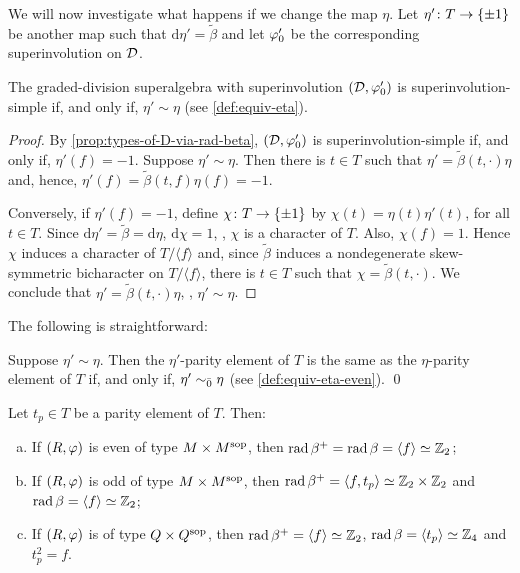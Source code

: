 We will now investigate what happens if we change the map $\eta$. 
Let $\eta'\colon T \to \{ \pm 1 \}$ be another map such that $\mathrm{d}\eta' = \tilde \beta$ and let $\varphi_0'$ be the corresponding superinvolution on $\mathcal{D}$.  

\begin{lemma}\label{lemma:one-eta}
    The graded-division superalgebra with superinvolution $(\mathcal{D}, \varphi_0')$ is super\-in\-vo\-lu\-tion-sim\-ple if, and only if, $\eta' \sim \eta$ (see \cref{def:equiv-eta}). 
\end{lemma}

\begin{proof}
    By \cref{prop:types-of-D-via-rad-beta}, $(\mathcal{D}, \varphi_0')$ is superinvolution-simple if, and only if, $\eta'(f) = -1$.  
    Suppose $\eta' \sim \eta$. 
    Then there is $t\in T$ such that $\eta' = \tilde\beta(t, \cdot) \eta$ and, hence, $\eta'(f) = \tilde\beta(t, f) \eta(f) = -1$. 
    
    Conversely, if $\eta' (f) = -1$, define $\chi\colon T \to \{ \pm 1 \}$ by $\chi(t) = \eta(t)\eta'(t)$, for all $t\in T$. 
    Since $\mathrm{d}\eta' = \tilde\beta = \mathrm{d}\eta$, $\mathrm{d}\chi = 1$, \ie, $\chi$ is a character of $T$. 
    Also, $\chi(f) = 1$. 
    Hence $\chi$ induces a character of $T/ \langle f \rangle$ and, since $\tilde\beta$ induces a nondegenerate skew-symmetric bicharacter on $T/ \langle f \rangle$, there is $t\in T$ such that $\chi = \tilde\beta(t, \cdot)$. 
    We conclude that $\eta' = \tilde\beta(t, \cdot) \eta$, \ie, $\eta' \sim \eta$.
\end{proof}

The following is straightforward:

\begin{lemma}\label{lemma:2-etas}
    Suppose $\eta' \sim \eta$. 
    Then the $\eta'$-parity element of $T$ is the same as the
    $\eta$-parity element of $T$ if, and only if, $\eta' \sim_{\bar{0}} \eta$ (see \cref{def:equiv-eta-even}). \qed
\end{lemma} 


\begin{prop}\label{cor:rad-beta+-MxM-QxQ}
    Let $t_p\in T$ be a parity element of $T$. 
    Then: 
    \begin{enumerate}[(a)]
        \item If $(R,\varphi)$ is even of type $M\times M^{\mathrm{sop}}$, then $\operatorname{rad} \beta^+ = \operatorname{rad} \beta = \langle f \rangle \simeq \mathbb{Z}_2$; 
        \label{item:even-MxM}
        \item If $(R,\varphi)$ is odd of type $M\times M^{\mathrm{sop}}$, then $\operatorname{rad} \beta^+ = \langle f, t_p \rangle \simeq \mathbb{Z}_2 \times \mathbb{Z}_2$ and $\operatorname{rad} \beta = \langle f \rangle \simeq \mathbb{Z}_2$; 
        \label{item:odd-MxM}
        \item If $(R,\varphi)$ is of type $Q\times Q^{\mathrm{sop}}$, then $\operatorname{rad} \beta^+ = \langle f \rangle \simeq \mathbb{Z}_2$, $\operatorname{rad} \beta = \langle t_p \rangle \simeq \mathbb{Z}_4$ and $t_p^2 = f$. 
        \label{item:QxQ}
    \end{enumerate}
\end{prop}

